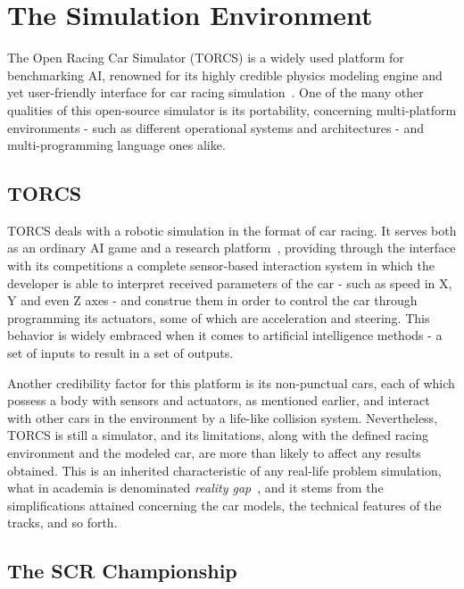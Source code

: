 \section{The Simulation Environment} \label{sec:Environment}

	The Open Racing Car Simulator (TORCS) is a widely used platform for benchmarking AI, renowned for
	its	highly credible physics modeling engine and yet user-friendly interface for car racing simulation~\cite{TORCS}. One of
	the	many other qualities of this open-source simulator is its portability, concerning multi-platform environments
	- such as different operational systems and architectures - and multi-programming language ones alike.

\subsection{TORCS} \label{subsec:TORCS}

	TORCS deals with a robotic simulation in the format of car racing. It serves both as an ordinary AI game and a
	research platform~\cite{2009}, providing through the interface with its competitions a complete sensor-based
	interaction system in which the developer is able to interpret received parameters of the car - such as speed in
	X, Y and even Z axes - and construe them in order to control the car through programming its actuators, some of
	which are acceleration and steering. This behavior is widely embraced when it comes to artificial intelligence
	methods - a set of inputs to result in a set of outputs.

	Another credibility factor for this platform is its non-punctual cars, each of which possess a body with sensors
	and actuators, as mentioned earlier, and interact with other cars in the environment by a life-like collision
	system. Nevertheless, TORCS is still a simulator, and its limitations, along with the defined racing environment
	and the modeled car, are more than likely to affect any results obtained. This is an inherited
	characteristic of any real-life problem simulation, what in academia is denominated \emph{reality gap}~\cite{RG}, and it stems from the simplifications attained concerning the car models, the technical features of the tracks,
	and so forth.

\subsection{The SCR Championship} \label{subsec:SCRC}

